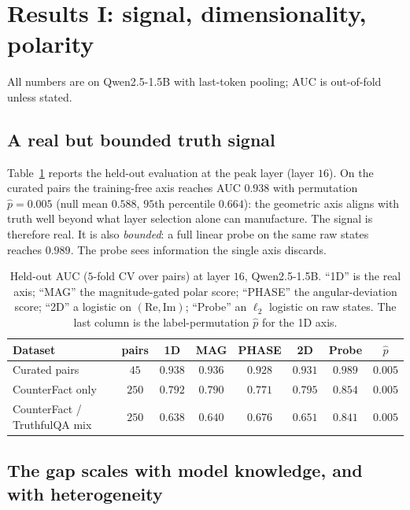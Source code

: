 \documentclass[11pt]{article}
\begin{document}
\section{Results I: signal, dimensionality, polarity}
\label{sec:results}

All numbers are on Qwen2.5-1.5B with last-token pooling; AUC is out-of-fold
unless stated.

\subsection{A real but bounded truth signal}
\label{sec:signal}

Table~\ref{tab:main} reports the held-out evaluation at the peak layer (layer
$16$). On the curated pairs the training-free axis reaches AUC $0.938$ with
permutation $\hat{p} = 0.005$ (null mean $0.588$, $95$th percentile $0.664$):
the geometric axis aligns with truth well beyond what layer selection alone
can manufacture. The signal is therefore real. It is also \emph{bounded}: a
full linear probe on the same raw states reaches $0.989$. The probe sees
information the single axis discards.

\begin{table}[t]
\centering
\caption{Held-out AUC ($5$-fold CV over pairs) at layer $16$, Qwen2.5-1.5B.
``1D'' is the real axis; ``MAG'' the magnitude-gated polar score; ``PHASE''
the angular-deviation score; ``2D'' a logistic on
$(\mathrm{Re},\mathrm{Im})$; ``Probe'' an $\ell_2$ logistic on raw states.
The last column is the label-permutation $\hat{p}$ for the 1D axis.}
\label{tab:main}
\begin{tabular}{lccccccc}
\toprule
Dataset & pairs & 1D & MAG & PHASE & 2D & Probe & $\hat{p}$ \\
\midrule
Curated pairs                    & $45$  & $0.938$ & $0.936$ & $0.928$ & $0.931$ & $0.989$ & $0.005$ \\
CounterFact only                 & $250$ & $0.792$ & $0.790$ & $0.771$ & $0.795$ & $0.854$ & $0.005$ \\
CounterFact / TruthfulQA mix     & $250$ & $0.638$ & $0.640$ & $0.676$ & $0.651$ & $0.841$ & $0.005$ \\
\bottomrule
\end{tabular}
\end{table}

\subsection{The gap scales with model knowledge, and with heterogeneity}
\label{sec:dim}
\end{document}
